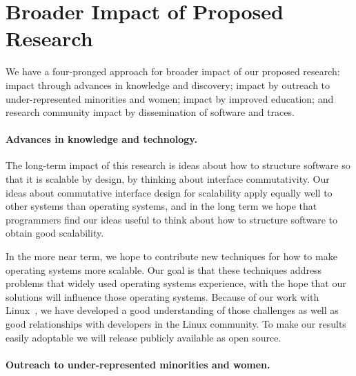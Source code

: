 \section{Broader Impact of Proposed Research}
\label{sec:broader}

We have a four-pronged approach for broader impact of our proposed
research: impact through advances in knowledge and discovery; impact
by outreach to under-represented minorities and women; impact by improved
education; and research community impact by dissemination of software
and traces.

\paragraph{Advances in knowledge and technology.} 

The long-term impact of this research is ideas about how to structure
software so that it is scalable by design, by thinking about interface
commutativity.  Our ideas about commutative interface design for
scalability apply equally well to other systems than operating systems,
and in the long term we hope that programmers find our ideas useful to
think about how to structure software to obtain good scalability.

In the more near term, we hope to contribute new techniques for how to
make operating systems more scalable.  Our goal is that these techniques
address problems that widely used operating systems experience, with
the hope that our solutions will influence those operating systems.
Because of our work with Linux~\cite{boyd-wickizer:scaling,clements:bonsai}, we
have developed a good understanding of those challenges as well as good
relationships with developers in the Linux community.  To make our results
easily adoptable we will release \sys publicly available as open source.

\paragraph{Outreach to under-represented minorities and women.}

